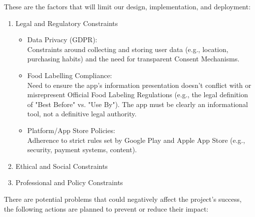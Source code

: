 These are the factors that will limit our design, implementation, and deployment:
\begin{enumerate}

\item Legal and Regulatory Constraints

\begin{itemize}

\item Data Privacy (GDPR): \\
Constraints around collecting and storing user data (e.g., location, purchasing habits) and the need for transparent Consent Mechanisms.

\item Food Labelling Compliance: \\
Need to ensure the app's information presentation doesn't conflict with or misrepresent Official Food Labeling Regulations (e.g., the legal definition of "Best Before" vs. "Use By"). The app must be clearly an informational tool, not a definitive legal authority.

\item Platform/App Store Policies: \\
Adherence to strict rules set by Google Play and Apple App Store (e.g., security, payment systems, content).

\end{itemize}

\item Ethical and Social Constraints

\item Professional and Policy Constraints

\end{enumerate}

\par

There are potential problems that could negatively affect the project's success, the following actions are planned to prevent or reduce their impact:

